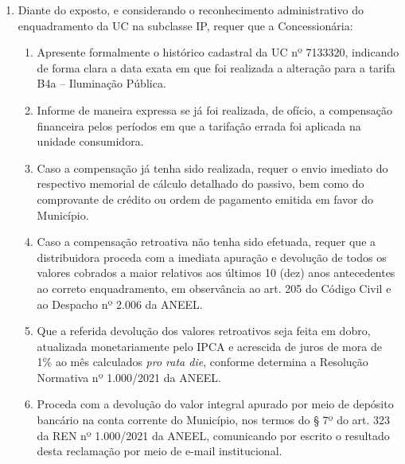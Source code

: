 \begin{enumerate}
    \item Diante do exposto, e considerando o reconhecimento administrativo do enquadramento da UC na subclasse IP, requer que a Concessionária:
    
    \begin{enumerate}
        \item Apresente formalmente o histórico cadastral da UC nº 7133320, indicando de forma clara a data exata em que foi realizada a alteração para a tarifa B4a -- Iluminação Pública.
        
        \item Informe de maneira expressa se já foi realizada, de ofício, a compensação financeira pelos períodos em que a tarifação errada foi aplicada na unidade consumidora.
        
        \item Caso a compensação já tenha sido realizada, requer o envio imediato do respectivo memorial de cálculo detalhado do passivo, bem como do comprovante de crédito ou ordem de pagamento emitida em favor do Município.
        
        \item Caso a compensação retroativa não tenha sido efetuada, requer que a distribuidora proceda com a imediata apuração e devolução de todos os valores cobrados a maior relativos aos últimos 10 (dez) anos antecedentes ao correto enquadramento, em observância ao art. 205 do Código Civil e ao Despacho nº 2.006 da ANEEL.
        
        \item Que a referida devolução dos valores retroativos seja feita em dobro, atualizada monetariamente pelo IPCA e acrescida de juros de mora de 1\% ao mês calculados \textit{pro rata die}, conforme determina a Resolução Normativa nº 1.000/2021 da ANEEL.
        
        \item Proceda com a devolução do valor integral apurado por meio de depósito bancário na conta corrente do Município, nos termos do § 7º do art. 323 da REN nº 1.000/2021 da ANEEL, comunicando por escrito o resultado desta reclamação por meio de e-mail institucional.
    \end{enumerate}
\end{enumerate}